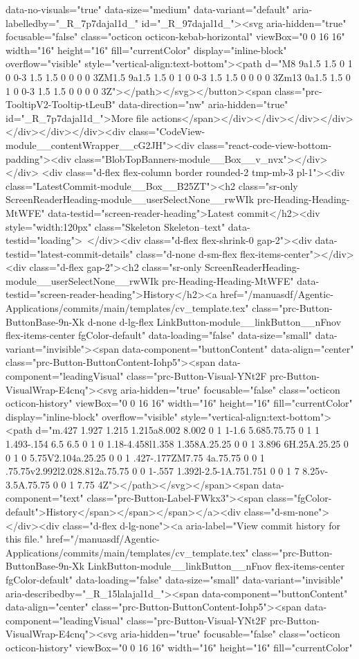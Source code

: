 {{{{{{{data-no-visuals="true" data-size="medium" data-variant="default" aria-labelledby="_R_7p7dajal1d_" id="_R_97dajal1d_"><svg aria-hidden="true" focusable="false" class="octicon octicon-kebab-horizontal" viewBox="0 0 16 16" width="16" height="16" fill="currentColor" display="inline-block" overflow="visible" style="vertical-align:text-bottom"><path d="M8 9a1.5 1.5 0 1 0 0-3 1.5 1.5 0 0 0 0 3ZM1.5 9a1.5 1.5 0 1 0 0-3 1.5 1.5 0 0 0 0 3Zm13 0a1.5 1.5 0 1 0 0-3 1.5 1.5 0 0 0 0 3Z"></path></svg></button><span class="prc-TooltipV2-Tooltip-tLeuB" data-direction="nw" aria-hidden="true" id="_R_7p7dajal1d_">More file actions</span></div></div></div></div></div></div></div><div class="CodeView-module__contentWrapper__cG2JH"><div class="react-code-view-bottom-padding"><div class="BlobTopBanners-module__Box__v_nvx"></div></div> <div class="d-flex flex-column border rounded-2 tmp-mb-3 pl-1"><div class="LatestCommit-module__Box__B25ZT"><h2 class="sr-only ScreenReaderHeading-module__userSelectNone__rwWIk prc-Heading-Heading-MtWFE" data-testid="screen-reader-heading">Latest commit</h2><div style="width:120px" class="Skeleton Skeleton--text" data-testid="loading"> </div><div class="d-flex flex-shrink-0 gap-2"><div data-testid="latest-commit-details" class="d-none d-sm-flex flex-items-center"></div><div class="d-flex gap-2"><h2 class="sr-only ScreenReaderHeading-module__userSelectNone__rwWIk prc-Heading-Heading-MtWFE" data-testid="screen-reader-heading">History</h2><a href="/manuasdf/Agentic-Applications/commits/main/templates/cv_template.tex" class="prc-Button-ButtonBase-9n-Xk d-none d-lg-flex LinkButton-module__linkButton__nFnov flex-items-center fgColor-default" data-loading="false" data-size="small" data-variant="invisible"><span data-component="buttonContent" data-align="center" class="prc-Button-ButtonContent-Iohp5"><span data-component="leadingVisual" class="prc-Button-Visual-YNt2F prc-Button-VisualWrap-E4cnq"><svg aria-hidden="true" focusable="false" class="octicon octicon-history" viewBox="0 0 16 16" width="16" height="16" fill="currentColor" display="inline-block" overflow="visible" style="vertical-align:text-bottom"><path d="m.427 1.927 1.215 1.215a8.002 8.002 0 1 1-1.6 5.685.75.75 0 1 1 1.493-.154 6.5 6.5 0 1 0 1.18-4.458l1.358 1.358A.25.25 0 0 1 3.896 6H.25A.25.25 0 0 1 0 5.75V2.104a.25.25 0 0 1 .427-.177ZM7.75 4a.75.75 0 0 1 .75.75v2.992l2.028.812a.75.75 0 0 1-.557 1.392l-2.5-1A.751.751 0 0 1 7 8.25v-3.5A.75.75 0 0 1 7.75 4Z"></path></svg></span><span data-component="text" class="prc-Button-Label-FWkx3"><span class="fgColor-default">History</span></span></span></a><div class="d-sm-none"></div><div class="d-flex d-lg-none"><a aria-label="View commit history for this file." href="/manuasdf/Agentic-Applications/commits/main/templates/cv_template.tex" class="prc-Button-ButtonBase-9n-Xk LinkButton-module__linkButton__nFnov flex-items-center fgColor-default" data-loading="false" data-size="small" data-variant="invisible" aria-describedby="_R_15lalajal1d_"><span data-component="buttonContent" data-align="center" class="prc-Button-ButtonContent-Iohp5"><span data-component="leadingVisual" class="prc-Button-Visual-YNt2F prc-Button-VisualWrap-E4cnq"><svg aria-hidden="true" focusable="false" class="octicon octicon-history" viewBox="0 0 16 16" width="16" height="16" fill="currentColor" }}}}}}}
